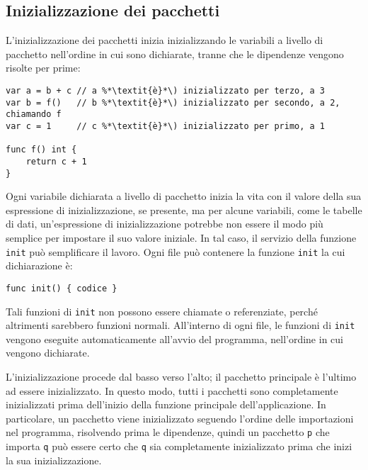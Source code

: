 \subsection{Inizializzazione dei pacchetti}
\label{subsec:inizializzazione_dei_pacchetti}%
L'inizializzazione dei pacchetti inizia inizializzando le variabili a livello di pacchetto nell'ordine in cui sono dichiarate, tranne che le dipendenze vengono risolte per prime:
\begin{lstlisting}[frame=single, label={lst:lstlisting1-5-1.1}]
var a = b + c // a %*\textit{è}*\) inizializzato per terzo, a 3
var b = f()   // b %*\textit{è}*\) inizializzato per secondo, a 2, chiamando f
var c = 1     // c %*\textit{è}*\) inizializzato per primo, a 1

func f() int {
    return c + 1
}
\end{lstlisting}
Ogni variabile dichiarata a livello di pacchetto inizia la vita con il valore della sua espressione di inizializzazione, se presente, ma per alcune variabili, come le tabelle di dati, un'espressione di inizializzazione potrebbe non essere il modo più semplice per impostare il suo valore iniziale.
In tal caso, il servizio della funzione \verb|init| può semplificare il lavoro.
Ogni file può contenere la funzione \verb|init| la cui dichiarazione è:
\begin{lstlisting}[label={lst:lstlisting1-5-1.2}]
func init() { codice }
\end{lstlisting}
Tali funzioni di \verb|init| non possono essere chiamate o referenziate, perché altrimenti sarebbero funzioni normali.
All'interno di ogni file, le funzioni di \verb|init| vengono eseguite automaticamente all'avvio del programma, nell'ordine in cui vengono dichiarate.

L'inizializzazione procede dal basso verso l'alto;
il pacchetto principale è l'ultimo ad essere inizializzato.
In questo modo, tutti i pacchetti sono completamente inizializzati prima dell'inizio della funzione principale dell'applicazione.
In particolare, un pacchetto viene inizializzato seguendo l'ordine delle importazioni nel programma, risolvendo prima le dipendenze, quindi un pacchetto \verb|p| che importa \verb|q| può essere certo che \verb|q| sia completamente inizializzato prima che inizi la sua inizializzazione.